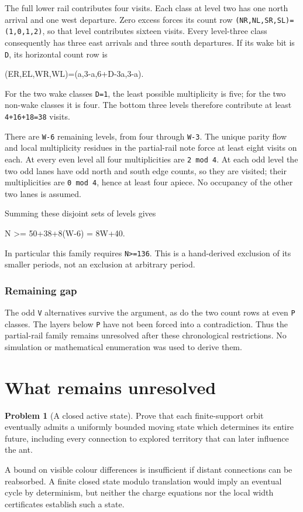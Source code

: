 \documentclass[11pt,letterpaper]{article}
\theoremstyle{plain}
\theoremstyle{definition}
\newtheorem{problem}[theorem]{Problem}
\begin{document}
\begin{NoHyper}
The full lower rail contributes four visits. Each class at level two has one north arrival and one west departure. Zero excess forces its count row \texttt{(NR,NL,SR,SL)=(1,0,1,2)}, so that level contributes sixteen visits. Every level-three class consequently has three east arrivals and three south departures. If its wake bit is \texttt{D}, its horizontal count row is

\begin{codeblock}
(ER,EL,WR,WL)=(a,3-a,6+D-3a,3-a).
\end{codeblock}

For the two wake classes \texttt{D=1}, the least possible multiplicity is five; for the two non-wake classes it is four. The bottom three levels therefore contribute at least \texttt{4+16+18=38} visits.

There are \texttt{W-6} remaining levels, from four through \texttt{W-3}. The unique parity flow and local multiplicity residues in the partial-rail note force at least eight visits on each. At every even level all four multiplicities are \texttt{2\ mod\ 4}. At each odd level the two odd lanes have odd north and south edge counts, so they are visited; their multiplicities are \texttt{0\ mod\ 4}, hence at least four apiece. No occupancy of the other two lanes is assumed.

Summing these disjoint sets of levels gives

\begin{codeblock}
N >= 50+38+8(W-6) = 8W+40.
\end{codeblock}

In particular this family requires \texttt{N\textgreater{}=136}. This is a hand-derived exclusion of its smaller periods, not an exclusion at arbitrary period.

\subsubsection{Remaining gap}

The odd \texttt{V} alternatives survive the argument, as do the two count rows at even \texttt{P} classes. The layers below \texttt{P} have not been forced into a contradiction. Thus the partial-rail family remains unresolved after these chronological restrictions. No simulation or mathematical enumeration was used to derive them.

\section{What remains unresolved}\label{sec:gap}
\begin{problem}[A closed active state]\label{prob:retreat}
Prove that each finite-support orbit eventually admits a uniformly bounded
moving state which determines its entire future, including every connection
to explored territory that can later influence the ant.
\end{problem}
A bound on visible colour differences is insufficient if distant connections
can be reabsorbed. A finite closed state modulo translation would imply an
eventual cycle by determinism, but neither the charge equations nor the local
width certificates establish such a state.


\end{NoHyper}
\end{document}

